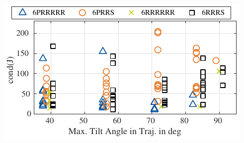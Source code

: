 \documentclass[fleqn,a4paper,10pt]{article}
\renewenvironment{figure}
  {\par\vspace{6pt}\noindent\minipage{\linewidth}}
  {\endminipage\par\vspace{6pt}}
\begin{document}
\begin{multicols}{2}
\begin{figure}
\centering
\includegraphics{./Bilder/figure_condition_vs_tiltangle.pdf}
\vspace{-0.4cm} %
\label{fig:condition_vs_tiltangle}
\end{figure}








\end{multicols}
\end{document}
